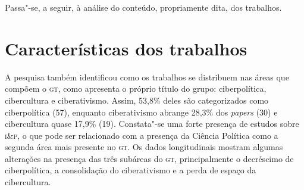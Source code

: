Passa"-se, a seguir, à análise do conteúdo, propriamente dita, dos
trabalhos.

\section{Características dos trabalhos}

A pesquisa também identificou como os trabalhos se distribuem nas áreas
que compõem o \textsc{gt}, como apresenta o próprio título do grupo:
ciberpolítica, cibercultura e ciberativismo. Assim, 53,8\% deles são
categorizados como ciberpolítica (57), enquanto ciberativismo abrange
28,3\% dos \textit{papers} (30) e cibercultura quase 17,9\% (19).
Constata"-se uma forte presença de estudos sobre \textsc{i\&p}, o
que pode ser relacionado com a presença da Ciência Política como a
segunda área mais presente no \textsc{gt}. Os dados longitudinais mostram algumas
alterações na presença das três subáreas do \textsc{gt}, principalmente o
decréscimo de ciberpolítica, a consolidação do ciberativismo e a perda
de espaço da cibercultura.


